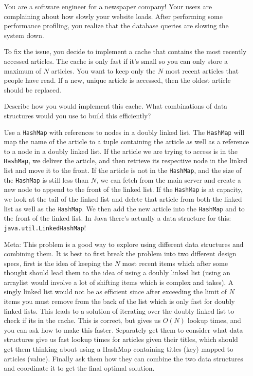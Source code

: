 \question You are a software engineer for a newspaper company! Your users are complaining about how slowly your website loads. After performing some performance profiling, you realize that the database queries are slowing the system down.

To fix the issue, you decide to implement a cache that contains the most recently accessed articles. The cache is only fast if it's small so you can only store a maximum of $N$ articles. You want to keep only the $N$ most recent articles that people have read. If a new, unique article is accessed, then the oldest article should be replaced.

Describe how you would implement this cache. What combinations of data structures would you use to build this efficiently? 

\begin{solution}[2in]
Use a \texttt{HashMap} with references to nodes in a doubly linked list. The \texttt{HashMap} will map the name of the article to a tuple containing the article as well as a reference to a node in a doubly linked list. If the article we are trying to access is in the \texttt{HashMap}, we deliver the article, and then retrieve its respective node in the linked list and move it to the front. If the article is not in the \texttt{HashMap}, and the size of the \texttt{HashMap} is still less than $N$, we can fetch from the main server and create a new node to append to the front of the linked list. If the \texttt{HashMap} is at capacity, we look at the tail of the linked list and delete that article from both the linked list as well as the \texttt{HashMap}. We then add the new article into the \texttt{HashMap} and to the front of the linked list. In Java there's actually a data structure for this: \texttt{java.util.LinkedHashMap}!

Meta: This problem is a good way to explore using different data structures and combining them. It is best to first break the problem into two different design specs, first is the idea of keeping the $N$ most recent items which after some thought should lead them to the idea of using a doubly linked list (using an arraylist would involve a lot of shifting items which is complex and takes). A singly linked list would not be as efficient since after exceeding the limit of $N$ items you must remove from the back of the list which is only fast for doubly linked lists.
This leads to a solution of iterating over the doubly linked list to check if its in the cache. This is correct, but gives us $O(N)$ lookup times, and you can ask how to make this faster. Separately get them to consider what data structures give us fast lookup times for articles given their titles, which should get them thinking about using a HashMap containing titles (key) mapped to articles (value).
Finally ask them how they can combine the two data structures and coordinate it to get the final optimal solution.
\end{solution}